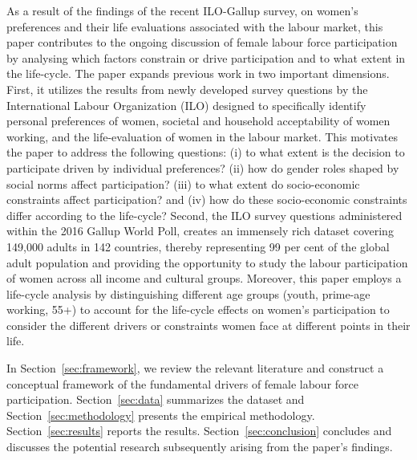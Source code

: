 As a result of the findings of the recent ILO-Gallup survey, on women's preferences and their life evaluations associated with the labour market, this paper contributes to the ongoing discussion of female labour force participation by analysing which factors constrain or drive participation and to what extent in the life-cycle. The paper expands previous work in two important dimensions. First, it utilizes the results from newly developed survey questions by the International Labour Organization (ILO) designed to specifically identify personal preferences of women, societal and household acceptability of women working, and the life-evaluation of women in the labour market. This motivates the paper to address the following questions: (i) to what extent is the decision to participate driven by individual preferences? (ii) how do gender roles shaped by social norms affect participation? (iii) to what extent do socio-economic constraints affect participation? and (iv) how do these socio-economic constraints differ according to the life-cycle? Second, the ILO survey questions administered within the 2016 Gallup World Poll, creates an immensely rich dataset covering 149,000 adults in 142 countries, thereby representing 99 per cent of the global adult population and providing the opportunity to study the labour participation of women across all income and cultural groups. Moreover, this paper employs a life-cycle analysis by distinguishing different age groups (youth, prime-age working, 55+) to account for the life-cycle effects on women's participation to consider the different drivers or constraints women face at different points in their life. 

In Section~\ref{sec:framework}, we review the relevant literature and construct a conceptual framework of the fundamental drivers of female labour force participation.  Section~\ref{sec:data} summarizes the dataset and Section~\ref{sec:methodology} presents the empirical methodology. Section~\ref{sec:results} reports the results. Section~\ref{sec:conclusion} concludes and discusses the  potential research subsequently arising from the paper's findings.
 